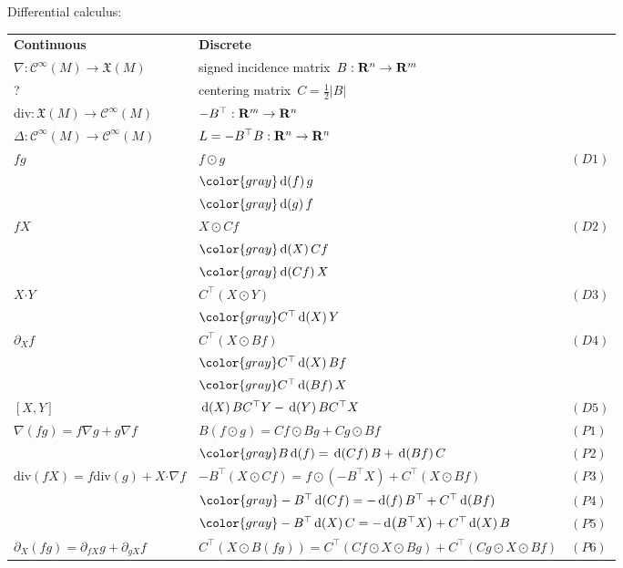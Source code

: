 \bigskip




Differential calculus:\newline
\begin{tabular}{|l|l|l}
	\cline{1-2}
	{\bf Continuous} & {\bf Discrete} &\\
	\cline{1-2}
	$\nabla:\mathcal{C}^\infty(M)\to\mathfrak{X}(M)$ & signed incidence
	matrix~$B:\mathbf{R}^n\to\mathbf{R}^m$ &\\
	\cline{1-2}
	?%
	& centering matrix~$C=\tfrac12|B|$ &\\
	\cline{1-2}
	$\mathrm{div}:\mathfrak{X}(M)\to\mathcal{C}^\infty(M)$
	& $-B^\top:\mathbf{R}^m\to\mathbf{R}^n$ &\\
	\cline{1-2}
	$\Delta:\mathcal{C}^\infty(M)\to\mathcal{C}^\infty(M)$ &
	$L=-B^\top B : \mathbf{R}^n\to\mathbf{R}^n$ &\\
	\cline{1-2}
	$fg$ & $f\odot g\quad$
	& {\small $(D1)$}\\
	& $\color{gray}\diag{f}g$ & \\
	& $\color{gray}\diag{g}f$ & \\
	\cline{1-2}
	$fX$ & $X\odot Cf\quad$
	&{\small $(D2)$} \\
	& $\color{gray}\diag{X}Cf$ & \\
	& $\color{gray}\diag{Cf}X$ & \\
	\cline{1-2}
	$X \boldsymbol{\cdot} Y$ & $C^\top(X\odot Y)$
	&{\small $(D3)$}\\
	& $\color{gray}C^\top\diag{X}Y$ & \\
	\cline{1-2}
	$\partial_X f$ & $C^\top\left(X\odot Bf\right)$
	&{\small $(D4)$}\\
	& $\color{gray}C^\top\diag{X}Bf$ & \\
	& $\color{gray}C^\top\diag{Bf}X$ & \\
	\cline{1-2}
	$[X,Y]$ &
	$\,\mathrm{d}\!\left(X\right)BC^\top Y- \,\mathrm{d}\!\left(Y\right)BC^\top X$
	&{\small $(D5)$} \\
	\cline{1-3}
	$\nabla\left(fg\right)=f\nabla g+g\nabla f$ &
	$B\left(f\odot g\right)=Cf\odot B g+Cg\odot Bf$
	&{\small $(P1)$}\\
	&
	$\color{gray}B\diag{f}=\diag{Cf}B+\diag{Bf}C$
	&{\small $(P2)$}\\
	\cline{1-3}
	$\mathrm{div}\left(fX\right)
	=f\mathrm{div}\left(g\right)+X\boldsymbol{\cdot}\nabla f$
	&
	$-B^\top\left(X\odot Cf\right)
	=f\odot\left(-B^\top X\right)
	+C^\top\left(X\odot Bf\right)$
	&{\small $(P3)$}\\
	&
	$\color{gray}
	-B^\top\diag{Cf} = -\diag{f}B^\top+C^\top\diag{Bf}
	$
	&{\small $(P4)$}\\
	&
	$\color{gray}
	-B^\top\diag{X}C = -\diag{B^\top X} + C^\top\diag{X}B
	$
	&{\small $(P5)$}\\
	\cline{1-3}
	$\partial_X\left(fg\right)=\partial_{fX}g+\partial_{gX}f$
	&
	$C^\top\left(X\odot B\left(fg\right)\right)=%
	C^\top\left(Cf\odot X\odot Bg\right)
	+
	C^\top\left(Cg\odot X\odot Bf \right)
	$
	&{\small $(P6)$}\\
	\cline{1-2}
\end{tabular}

